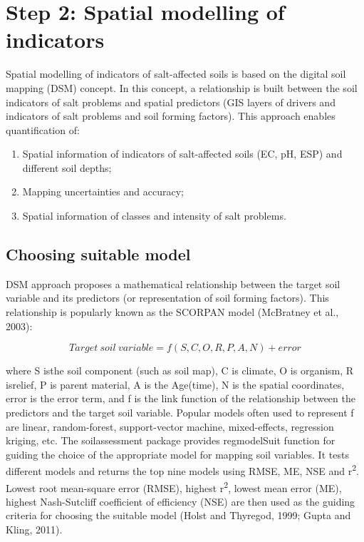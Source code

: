\documentclass[
  10pt,
  b5paper,
]{book}
\providecommand{\tightlist}{%
  \setlength{\itemsep}{0pt}\setlength{\parskip}{0pt}}
\begin{document}
\hypertarget{step-2-spatial-modelling-of-indicators}{%
\section{Step 2: Spatial modelling of indicators}\label{step-2-spatial-modelling-of-indicators}}

Spatial modelling of indicators of salt-affected soils is based on the digital soil mapping (DSM) concept. In this concept, a relationship is built between the soil indicators of salt problems and spatial predictors (GIS layers of drivers and indicators of salt problems and soil forming factors). This approach enables quantification of:

\begin{enumerate}
\def\labelenumi{\arabic{enumi}.}
\tightlist
\item
  Spatial information of indicators of salt-affected soils (EC, pH, ESP) and different soil depths;
\item
  Mapping uncertainties and accuracy;
\item
  Spatial information of classes and intensity of salt problems.
\end{enumerate}

\hypertarget{choosing-suitable-model}{%
\subsection{Choosing suitable model}\label{choosing-suitable-model}}

DSM approach proposes a mathematical relationship between the target soil variable and its predictors (or representation of soil forming factors). This relationship is popularly known as the SCORPAN model (McBratney et al., 2003):

\begin{equation}
\tag{5.1}
Target\ soil\ variable = f(S,C,O,R,P,A,N) + error
\end{equation}

where S isthe soil component (such as soil map), C is climate, O is organism, R isrelief, P is parent material,
A is the Age(time), N is the spatial coordinates, error is the error term, and f is the link function of the
relationship between the predictors and the target soil variable. Popular models often used to represent f
are linear, random-forest, support-vector machine, mixed-effects, regression kriging, etc. The
soilassessment package provides regmodelSuit function for guiding the choice of the appropriate model
for mapping soil variables. It tests different models and returns the top nine models using RMSE, ME, NSE
and r\textsuperscript{2}. Lowest root mean-square error (RMSE), highest r\textsuperscript{2}, lowest mean error (ME), highest Nash-Sutcliff
coefficient of efficiency (NSE) are then used as the guiding criteria for choosing the suitable model (Holst
and Thyregod, 1999; Gupta and Kling, 2011).
\end{document}
